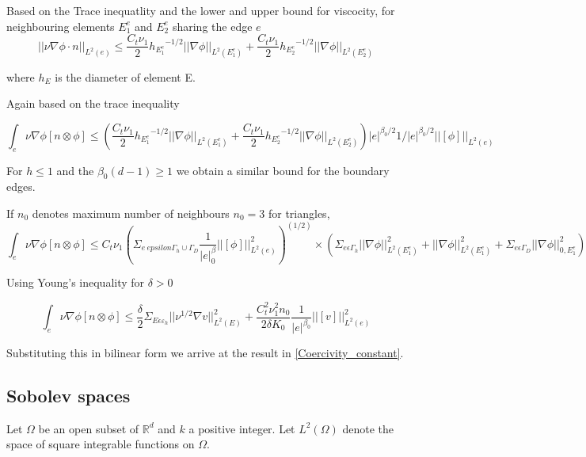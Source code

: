 \documentclass[a4paper,12pt]{book}
\begin{document}
Based on the Trace inequatlity and the lower and upper bound for viscocity, for neighbouring elements $E_1^e$ and $E_2^e$ sharing the edge $e$ 
\begin{equation}
||{\nu \nabla \phi \cdot n}||_{L^2(e)} \leq \frac{C_t \nu_1}{2} {h_{E_1^e}}^{-1/2} ||\nabla \phi||_{L^2(E_1^e)} + \frac{C_t \nu_1}{2} {h_{E_2^e}}^{-1/2} ||\nabla \phi||_{L^2(E_2^e)}
\end{equation}

where $h_E$ is the diameter of element E.

Again based on the trace inequality

\begin{equation}
\int_e {\nu \nabla \phi}[n \otimes \phi] \leq (\frac{C_t \nu_1}{2} {h_{E_1^e}}^{-1/2} ||\nabla \phi||_{L^2(E_1^e)} + \frac{C_t \nu_1}{2} {h_{E_2^e}}^{-1/2} ||\nabla \phi||_{L^2(E_2^e)}) |e|^{\beta_0/2} {1/|e|}^{\beta_0/2} ||[\phi]||_{L^2(e)}
\end{equation}

For $h \leq 1$ and the $\beta_0 (d-1) \geq 1$ we obtain a similar bound for the boundary edges.

If $n_0$ denotes maximum number of neighbours $n_0 = 3$ for triangles,
\begin{equation}
\int_e {\nu \nabla \phi}[n \otimes \phi] \leq C_t \nu_1 (\Sigma_{e \ epsilon \Gamma_h \cup \Gamma_D} \frac{1}{|e|^\beta_0} ||[\phi]||^2_{L^2(e)})^(1/2) \times (\Sigma_{e \epsilon \Gamma_h} ||\nabla \phi||^2_{L^2(E_1^e)} + ||\nabla \phi||^2_{L^2(E_1^e)} + \Sigma_{e \epsilon \Gamma_D} ||\nabla \phi||^2_{0,E_1^e})
\end{equation}

Using Young's inequality for $\delta > 0$

\begin{equation}
\int_e {\nu \nabla \phi}[n \otimes \phi] \leq \frac{\delta}{2} \Sigma_{E \epsilon \varepsilon_h} ||\nu^{1/2} \nabla v ||^2_{L^2(E)} +  \frac{C_t^2 \nu_1^2 n_0}{2 \delta K_0} \frac{1}{|e|^{\beta_0}} ||[v]||^2_{L^2(e)}
\end{equation}


Substituting this in bilinear form we arrive at the result in \ref{Coercivity_constant}.

\subsection{Sobolev spaces} \cite{crbm}

Let $\Omega$ be an open subset of $\mathbb{R}^d$ and $k$ a positive integer. Let $L^2(\Omega)$ denote the space of square integrable functions on $\Omega$. 
\end{document}
